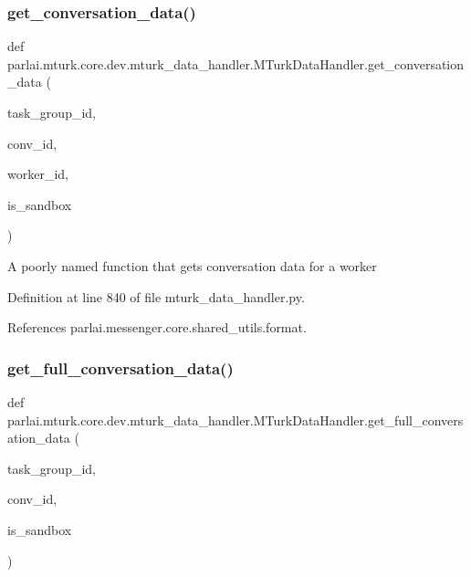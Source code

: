 \subsubsection{\texorpdfstring{get\+\_\+conversation\+\_\+data()}{get\_conversation\_data()}}
{\footnotesize\ttfamily def parlai.\+mturk.\+core.\+dev.\+mturk\+\_\+data\+\_\+handler.\+M\+Turk\+Data\+Handler.\+get\+\_\+conversation\+\_\+data (\begin{DoxyParamCaption}\item[{}]{task\+\_\+group\+\_\+id,  }\item[{}]{conv\+\_\+id,  }\item[{}]{worker\+\_\+id,  }\item[{}]{is\+\_\+sandbox }\end{DoxyParamCaption})\hspace{0.3cm}{\ttfamily [static]}}

\begin{DoxyVerb}A poorly named function that gets conversation data for a worker\end{DoxyVerb}
 

Definition at line 840 of file mturk\+\_\+data\+\_\+handler.\+py.



References parlai.\+messenger.\+core.\+shared\+\_\+utils.\+format.

\mbox{\label{classparlai_1_1mturk_1_1core_1_1dev_1_1mturk__data__handler_1_1MTurkDataHandler_af089c1fdb7266ba77936d53d957932f4}} 
\subsubsection{\texorpdfstring{get\+\_\+full\+\_\+conversation\+\_\+data()}{get\_full\_conversation\_data()}}
{\footnotesize\ttfamily def parlai.\+mturk.\+core.\+dev.\+mturk\+\_\+data\+\_\+handler.\+M\+Turk\+Data\+Handler.\+get\+\_\+full\+\_\+conversation\+\_\+data (\begin{DoxyParamCaption}\item[{}]{task\+\_\+group\+\_\+id,  }\item[{}]{conv\+\_\+id,  }\item[{}]{is\+\_\+sandbox }\end{DoxyParamCaption})\hspace{0.3cm}{\ttfamily [static]}}

